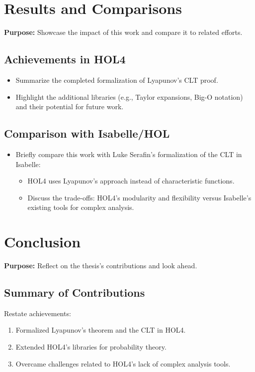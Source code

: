 \section{Results and Comparisons}
\textbf{Purpose:} Showcase the impact of this work and compare it to related efforts.
\subsection{Achievements in HOL4}
\begin{itemize}
    \item Summarize the completed formalization of Lyapunov’s CLT proof.
    \item  Highlight the additional libraries (e.g., Taylor expansions, Big-O notation) and their potential for future work.
\end{itemize}
 
\subsection{Comparison with Isabelle/HOL}
\begin{itemize}
    \item Briefly compare this work with Luke Serafin’s formalization of the CLT in Isabelle:
    \begin{itemize}
        \item HOL4 uses Lyapunov’s approach instead of characteristic functions.
        \item Discuss the trade-offs: HOL4’s modularity and flexibility versus Isabelle’s existing tools for complex analysis.
    \end{itemize}
\end{itemize}

\section{Conclusion}
\textbf{Purpose:} Reflect on the thesis’s contributions and look ahead.
\subsection{Summary of Contributions}
Restate achievements:
\begin{enumerate}
     \item Formalized Lyapunov’s theorem and the CLT in HOL4.
     \item  Extended HOL4’s libraries for probability theory.
     \item  Overcame challenges related to HOL4’s lack of complex analysis tools.
\end{enumerate}

